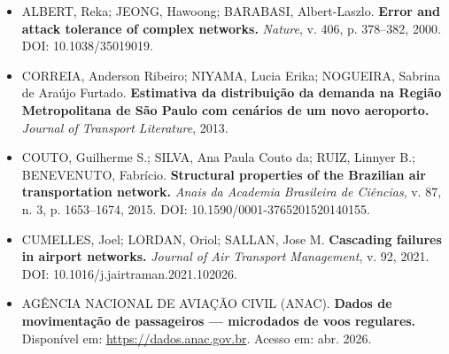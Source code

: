 \documentclass[12pt,a4paper]{article}
\begin{document}
\begin{itemize}[leftmargin=*, label={}, itemsep=8pt]

\item ALBERT, Reka; JEONG, Hawoong; BARABASI, Albert-Laszlo. \textbf{Error and attack tolerance
of complex networks.} \textit{Nature}, v. 406, p. 378--382, 2000. DOI: 10.1038/35019019.

\item CORREIA, Anderson Ribeiro; NIYAMA, Lucia Erika; NOGUEIRA, Sabrina de Araújo Furtado.
\textbf{Estimativa da distribuição da demanda na Região Metropolitana de São Paulo com cenários
de um novo aeroporto.} \textit{Journal of Transport Literature}, 2013.

\item COUTO, Guilherme S.; SILVA, Ana Paula Couto da; RUIZ, Linnyer B.; BENEVENUTO, Fabrício.
\textbf{Structural properties of the Brazilian air transportation network.} \textit{Anais da
Academia Brasileira de Ciências}, v. 87, n. 3, p. 1653--1674, 2015.
DOI: 10.1590/0001-3765201520140155.

\item CUMELLES, Joel; LORDAN, Oriol; SALLAN, Jose M. \textbf{Cascading failures in airport
networks.} \textit{Journal of Air Transport Management}, v. 92, 2021.
DOI: 10.1016/j.jairtraman.2021.102026.

\item AGÊNCIA NACIONAL DE AVIAÇÃO CIVIL (ANAC). \textbf{Dados de movimentação de passageiros
--- microdados de voos regulares.} Disponível em: \url{https://dados.anac.gov.br}. Acesso em:
abr. 2026.

\end{itemize}
\end{document}
